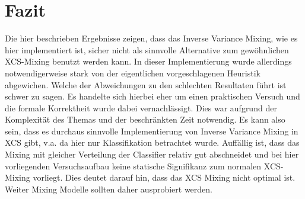 \documentclass{ocsmnar}
\begin{document}


\section{Fazit}
Die hier beschrieben Ergebnisse zeigen, dass das Inverse Variance Mixing, wie es hier implementiert ist, sicher nicht als sinnvolle Alternative zum gewöhnlichen XCS-Mixing benutzt werden kann. In dieser Implementierung wurde allerdings notwendigerweise stark von der eigentlichen vorgeschlagenen Heuristik abgewichen. Welche der Abweichungen zu den schlechten Resultaten führt ist schwer zu sagen. 
Es handelte sich hierbei eher um einen praktischen Versuch und die formale Korrektheit wurde dabei vernachlässigt. Dies war aufgrund der Komplexität des Themas und der beschränkten Zeit notwendig. Es kann also sein, dass es durchaus sinnvolle Implementierung von Inverse Variance Mixing in XCS gibt, v.a. da hier nur Klassifikation betrachtet wurde. 
Auffällig ist, dass das Mixing mit gleicher Verteilung der Classifier relativ gut abschneidet und bei hier vorliegenden Versuchsaufbau keine statische Signifikanz zum normalen XCS-Mixing vorliegt. Dies deutet darauf hin, dass das XCS Mixing nicht optimal ist. Weiter Mixing Modelle sollten daher ausprobiert werden.  















\end{document}
